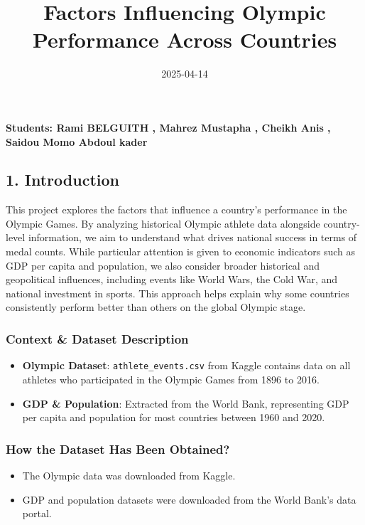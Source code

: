 \documentclass[
]{article}
\title{Factors Influencing Olympic Performance Across Countries}
\author{}
\date{\vspace{-2.5em}2025-04-14}
\providecommand{\tightlist}{%
  \setlength{\itemsep}{0pt}\setlength{\parskip}{0pt}}
\begin{document}
\maketitle

{
\setcounter{tocdepth}{2}
\tableofcontents
}
\textbf{Students: Rami BELGUITH , Mahrez Mustapha , Cheikh Anis , Saidou
Momo Abdoul kader }

\subsection{1. Introduction}\label{introduction}

This project explores the factors that influence a country's performance
in the Olympic Games. By analyzing historical Olympic athlete data
alongside country-level information, we aim to understand what drives
national success in terms of medal counts. While particular attention is
given to economic indicators such as GDP per capita and population, we
also consider broader historical and geopolitical influences, including
events like World Wars, the Cold War, and national investment in sports.
This approach helps explain why some countries consistently perform
better than others on the global Olympic stage.

\subsubsection{Context \& Dataset
Description}\label{context-dataset-description}

\begin{itemize}
\tightlist
\item
  \textbf{Olympic Dataset}: \texttt{athlete\_events.csv} from Kaggle
  contains data on all athletes who participated in the Olympic Games
  from 1896 to 2016.
\item
  \textbf{GDP \& Population}: Extracted from the World Bank,
  representing GDP per capita and population for most countries between
  1960 and 2020.
\end{itemize}

\subsubsection{How the Dataset Has Been
Obtained?}\label{how-the-dataset-has-been-obtained}

\begin{itemize}
\tightlist
\item
  The Olympic data was downloaded from Kaggle.
\item
  GDP and population datasets were downloaded from the World Bank's data
  portal.
\end{itemize}
\end{document}
